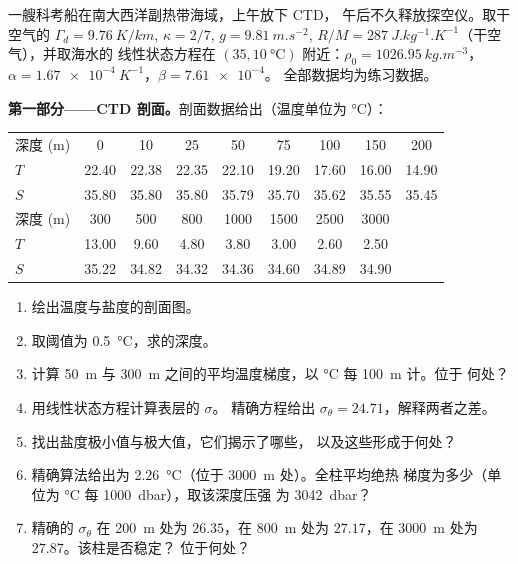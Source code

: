 \begin{problem}
\label{pb:b1:fluid-envelopes-structure:1}
一艘科考船在南大西洋副热带海域，上午放下 CTD，
午后不久释放探空仪。取干空气的 $\Gamma_d =
\qty{9.76}{K/km}$, $\kappa = 2/7$, $g = \qty{9.81}{m.s^{-2}}$, $R/M =
\qty{287}{J.kg^{-1}.K^{-1}}$（干空气），并取海水的
线性状态方程在 $(35, \qty{10}{\celsius})$ 附近：$\rho_0 = \qty{1026.95}{kg.m^{-3}}$，
$\alpha = \qty{1.67e-4}{K^{-1}}$，$\beta = \num{7.61e-4}$。
全部数据均为练习数据。

\medskip
\noindent\textbf{第一部分——CTD 剖面。}剖面数据给出（温度单位为
\si{\celsius}）：
\begin{center}
\small
\setlength{\tabcolsep}{3pt}
\begin{tabular}{|l|*{8}{c}|}
\hline
深度 (m) & 0 & 10 & 25 & 50 & 75 & 100 & 150 & 200 \\
$T$ & 22.40 & 22.38 & 22.35 & 22.10 & 19.20 & 17.60 & 16.00 & 14.90 \\
$S$ & 35.80 & 35.80 & 35.80 & 35.79 & 35.70 & 35.62 & 35.55 & 35.45 \\
\hline
深度 (m) & 300 & 500 & 800 & 1000 & 1500 & 2500 & 3000 & \\
$T$ & 13.00 & 9.60 & 4.80 & 3.80 & 3.00 & 2.60 & 2.50 & \\
$S$ & 35.22 & 34.82 & 34.32 & 34.36 & 34.60 & 34.89 & 34.90 & \\
\hline
\end{tabular}
\end{center}
\begin{enumerate}
  \item 绘出温度与盐度的剖面图。
  \item 取阈值为 \qty{0.5}{\celsius}，求的深度。
  \item 计算 \qty{50}{m} 与
        \qty{300}{m} 之间的平均温度梯度，以 \si{\celsius} 每 \qty{100}{m} 计。位于
        何处？
  \item 用线性状态方程计算表层的 $\sigma$。
        精确方程给出 $\sigma_\theta = 24.71$，解释两者之差。
  \item 找出盐度极小值与极大值，它们揭示了哪些，
        以及这些形成于何处？
  \item 精确算法给出为
        \qty{2.26}{\celsius}（位于 \qty{3000}{m} 处）。全柱平均绝热
        梯度为多少（单位为 \si{\celsius} 每 \qty{1000}{dbar}），取该深度压强
        为 \qty{3042}{dbar}？
  \item 精确的 $\sigma_\theta$ 在 \qty{200}{m} 处为 $26.35$，在
        \qty{800}{m} 处为 $27.17$，在 \qty{3000}{m} 处为 $27.87$。该柱是否稳定？
        位于何处？
\end{enumerate}


\end{problem}
